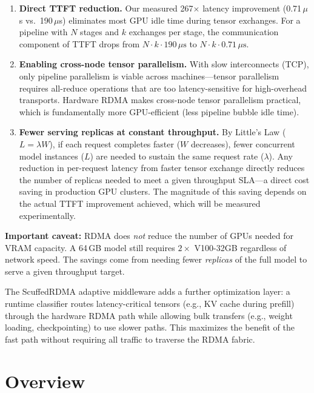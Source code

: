 \documentclass[10pt,letterpaper]{article}
\begin{document}
\begin{enumerate}[noitemsep]
    \item \textbf{Direct TTFT reduction.} Our measured 267$\times$ latency improvement (0.71\,$\mu$s vs.\ 190\,$\mu$s) eliminates most GPU idle time during tensor exchanges. For a pipeline with $N$ stages and $k$ exchanges per stage, the communication component of TTFT drops from $N \cdot k \cdot 190\,\mu\text{s}$ to $N \cdot k \cdot 0.71\,\mu\text{s}$.

    \item \textbf{Enabling cross-node tensor parallelism.} With slow interconnects (TCP), only pipeline parallelism is viable across machines---tensor parallelism requires all-reduce operations that are too latency-sensitive for high-overhead transports. Hardware RDMA makes cross-node tensor parallelism practical, which is fundamentally more GPU-efficient (less pipeline bubble idle time).

    \item \textbf{Fewer serving replicas at constant throughput.} By Little's Law ($L = \lambda W$), if each request completes faster ($W$ decreases), fewer concurrent model instances ($L$) are needed to sustain the same request rate ($\lambda$). Any reduction in per-request latency from faster tensor exchange directly reduces the number of replicas needed to meet a given throughput SLA---a direct cost saving in production GPU clusters. The magnitude of this saving depends on the actual TTFT improvement achieved, which will be measured experimentally.
\end{enumerate}

\textbf{Important caveat:} RDMA does \textit{not} reduce the number of GPUs needed for VRAM capacity. A 64\,GB model still requires $2\times$ V100-32GB regardless of network speed. The savings come from needing fewer \textit{replicas} of the full model to serve a given throughput target.

The ScuffedRDMA adaptive middleware adds a further optimization layer: a runtime classifier routes latency-critical tensors (e.g., KV cache during prefill) through the hardware RDMA path while allowing bulk transfers (e.g., weight loading, checkpointing) to use slower paths. This maximizes the benefit of the fast path without requiring all traffic to traverse the RDMA fabric.

\section{Overview}
\end{document}
